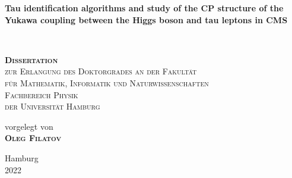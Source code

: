 
\begin{titlepage} %


\vspace{2cm}
    \centering

	\vspace{0.4cm}
    \parbox[t]{0.96\textwidth}{\rmfamily \setlength\parfillskip{0pt} \def\baselinestretch{1.1}\centering\Huge \bfseries Tau identification algorithms and study of the CP structure of the Yukawa coupling between the Higgs boson and tau leptons in CMS}\\
	\vspace{0.4cm}
    \vspace{2 cm} %
	
	
    \parbox[p]{0.95\textwidth}{\def\baselinestretch{1.4}\centering\scshape\textbf{\LARGE Dissertation} \\ {\large zur Erlangung des Doktorgrades an der Fakult{\"a}t\\ f{\"u}r Mathematik, Informatik und Naturwissenschaften \\ Fachbereich Physik \\ der Universit{\"a}t Hamburg} }
    
    \vspace{2 cm} %

    \parbox[b]{0.93\textwidth}{\def\baselinestretch{1.3}\centering\upshape \Large vorgelegt von \\ {\LARGE\scshape \bfseries Oleg Filatov } \\ %
    }
    
    \vspace{2 cm} %
    
    \parbox[b]{0.93\textwidth}{\def\baselinestretch{1.3}\centering\upshape\large Hamburg\\ 2022}

\end{titlepage}

